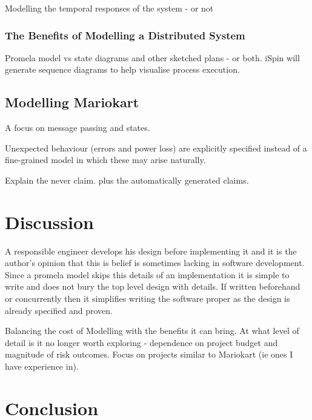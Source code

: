 Modelling the temporal responses of the system - or not

\subsubsection{The Benefits of Modelling a Distributed System}
Promela model vs state diagrams and other sketched plans - or both. iSpin will
 generate sequence diagrams to help visualise process execution.

\subsection{Modelling Mariokart}
A focus on message passing and states.

Unexpected behaviour (errors and power loss) are explicitly specified instead of 
a fine-grained model in which these may arise naturally.

Explain the never claim. plus the automatically generated claims.


\section{Discussion}
A responsible engineer develops his design before implementing it and it is the author's opinion 
that this is belief is sometimes lacking in software development. Since a promela model skips
this details of an implementation it is simple to write and does not bury the top level design 
with details. If written beforehand or concurrently then it simplifies writing the software proper
as the design is already specified and proven.

Balancing the cost of Modelling with the benefits it can bring. At what level of detail is it no longer worth 
exploring - dependence on project budget and magnitude of risk outcomes. Focus on projects similar to
Mariokart (ie ones I have experience in).

\section{Conclusion}
